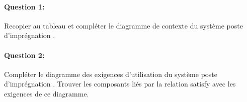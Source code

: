 \paragraph{Question 1:} Recopier au tableau et compléter le diagramme de contexte du système \og poste d'imprégnation \fg.

\begin{center}
\end{center}

\paragraph{Question 2:} Compléter le diagramme des exigences d'utilisation du système \og poste d'imprégnation \fg. Trouver les composants liés par la relation \og satisfy \fg avec les exigences de ce diagramme. 

